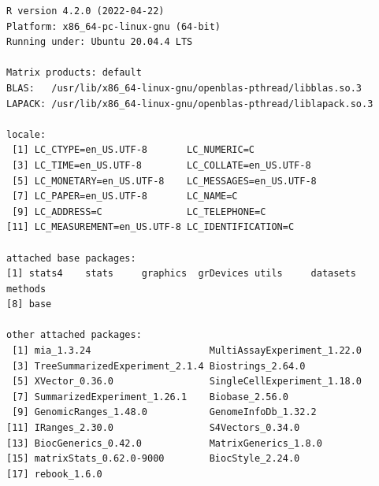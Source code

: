 \documentclass[
]{book}
\begin{document}
\begin{verbatim}
R version 4.2.0 (2022-04-22)
Platform: x86_64-pc-linux-gnu (64-bit)
Running under: Ubuntu 20.04.4 LTS

Matrix products: default
BLAS:   /usr/lib/x86_64-linux-gnu/openblas-pthread/libblas.so.3
LAPACK: /usr/lib/x86_64-linux-gnu/openblas-pthread/liblapack.so.3

locale:
 [1] LC_CTYPE=en_US.UTF-8       LC_NUMERIC=C              
 [3] LC_TIME=en_US.UTF-8        LC_COLLATE=en_US.UTF-8    
 [5] LC_MONETARY=en_US.UTF-8    LC_MESSAGES=en_US.UTF-8   
 [7] LC_PAPER=en_US.UTF-8       LC_NAME=C                 
 [9] LC_ADDRESS=C               LC_TELEPHONE=C            
[11] LC_MEASUREMENT=en_US.UTF-8 LC_IDENTIFICATION=C       

attached base packages:
[1] stats4    stats     graphics  grDevices utils     datasets  methods  
[8] base     

other attached packages:
 [1] mia_1.3.24                     MultiAssayExperiment_1.22.0   
 [3] TreeSummarizedExperiment_2.1.4 Biostrings_2.64.0             
 [5] XVector_0.36.0                 SingleCellExperiment_1.18.0   
 [7] SummarizedExperiment_1.26.1    Biobase_2.56.0                
 [9] GenomicRanges_1.48.0           GenomeInfoDb_1.32.2           
[11] IRanges_2.30.0                 S4Vectors_0.34.0              
[13] BiocGenerics_0.42.0            MatrixGenerics_1.8.0          
[15] matrixStats_0.62.0-9000        BiocStyle_2.24.0              
[17] rebook_1.6.0                  


\end{verbatim}
\end{document}
